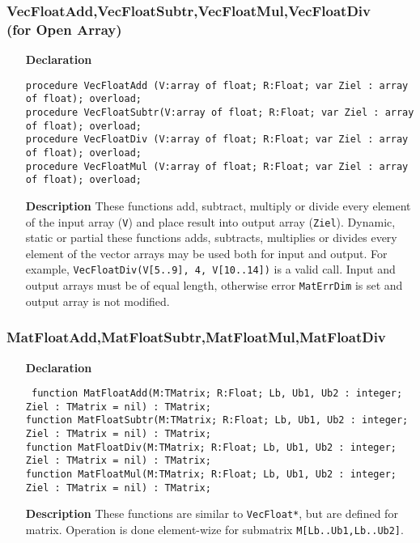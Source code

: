 \documentclass[12pt,a4paper,oneside]{report}
\newcommand{\lmathsix}[1]{   %
	\marginpar{\vspace{#1} 
		\begin{flushright}
			LMath 0.6
	\end{flushright} }
}
\newcommand{\declarationitem}[1]{\textbf{#1}}
\newcommand{\descriptiontitle}[1]{\textbf{#1}}
\newcommand{\code}[1]{\texttt{#1}}
\begin{document}
\subsubsection{VecFloatAdd,VecFloatSubtr,VecFloatMul,VecFloatDiv\\
	(for Open Array)} \lmathsix{-30pt}
\begin{itemize}
	\item[\declarationitem{Declaration}\hfill]
	\begin{flushleft}
\code{procedure VecFloatAdd  (V:array of float; R:Float; var Ziel : array of float); overload;\\
procedure VecFloatSubtr(V:array of float; R:Float; var Ziel : array of float); overload;\\
procedure VecFloatDiv  (V:array of float; R:Float; var Ziel : array of float); overload;\\
procedure VecFloatMul  (V:array of float; R:Float; var Ziel : array of float); overload;\\
}		
	\end{flushleft}
	\item[\descriptiontitle{Description}]
These functions add, subtract, multiply or divide every element of the input array (\code{V}) and place result into output array (\code{Ziel}). Dynamic, static or partial these functions adds, subtracts, multiplies or divides every element of the vector arrays may be used both for input and output. For example, \code{VecFloatDiv(V[5..9], 4, V[10..14])} is a valid call. Input and output arrays must be of equal length, otherwise error \code{MatErrDim} is set and output array is not modified. 	
\end{itemize}	


\subsubsection{MatFloatAdd,MatFloatSubtr,MatFloatMul,MatFloatDiv}
\label{MatFloatDiv}
\begin{itemize}
	\item[\declarationitem{Declaration}\hfill]\begin{flushleft}
\code{	function MatFloatAdd(M:TMatrix; R:Float; Lb, Ub1, Ub2 : integer; Ziel : TMatrix = nil) : TMatrix;}\\
	\code{function MatFloatSubtr(M:TMatrix; R:Float; Lb, Ub1, Ub2 : integer; Ziel : TMatrix = nil) : TMatrix;}\\
	\code{function MatFloatDiv(M:TMatrix; R:Float; Lb, Ub1, Ub2 : integer; Ziel : TMatrix = nil) : TMatrix;}\\
	\code{function MatFloatMul(M:TMatrix; R:Float; Lb, Ub1, Ub2 : integer; Ziel : TMatrix = nil) : TMatrix;}
	\end{flushleft}
	\item[\descriptiontitle{Description}]These functions are similar to \code{VecFloat*}, but are defined for matrix. Operation is done element-wize for submatrix \code{M[Lb..Ub1,Lb..Ub2]}.
\end{itemize}
\end{document}
